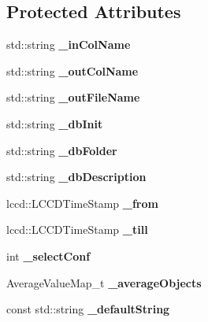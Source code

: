 \subsection*{Protected Attributes}
\begin{DoxyCompactItemize}
\item 
std::string {\bfseries \_\-inColName}\label{classCALICE_1_1ExtractConfigurationAverageProcessor_a6d532e2cc4838f68332367733b4a0bd8}

\item 
std::string {\bfseries \_\-outColName}\label{classCALICE_1_1ExtractConfigurationAverageProcessor_a2c538c11dc9a34d75e7d2a843702f06b}

\item 
std::string {\bfseries \_\-outFileName}\label{classCALICE_1_1ExtractConfigurationAverageProcessor_ab9111f08e45c3959b0ed36aa49bc96aa}

\item 
std::string {\bfseries \_\-dbInit}\label{classCALICE_1_1ExtractConfigurationAverageProcessor_a63aa312d9fb326bd9b868eed4d5d0e70}

\item 
std::string {\bfseries \_\-dbFolder}\label{classCALICE_1_1ExtractConfigurationAverageProcessor_a634cc4a35f2b694cee63d1eff7e06ada}

\item 
std::string {\bfseries \_\-dbDescription}\label{classCALICE_1_1ExtractConfigurationAverageProcessor_a50d196cf146cde52ea5bb0481ce514a6}

\item 
lccd::LCCDTimeStamp {\bfseries \_\-from}\label{classCALICE_1_1ExtractConfigurationAverageProcessor_ab06f9eaf8c5bdfbecc67576231cf32cd}

\item 
lccd::LCCDTimeStamp {\bfseries \_\-till}\label{classCALICE_1_1ExtractConfigurationAverageProcessor_a6ca967970fd97f5134bb45760a1224f8}

\item 
int {\bfseries \_\-selectConf}\label{classCALICE_1_1ExtractConfigurationAverageProcessor_ac22b0611b66e8732f7b8927a8bbf70c6}

\item 
AverageValueMap\_\-t {\bfseries \_\-averageObjects}\label{classCALICE_1_1ExtractConfigurationAverageProcessor_a0fc2d84cee1e5dcb243653b8c2ac15fc}

\item 
const std::string {\bfseries \_\-defaultString}\label{classCALICE_1_1ExtractConfigurationAverageProcessor_a1f8e7e6467b59f155e0a50acfbf19859}

\end{DoxyCompactItemize}
